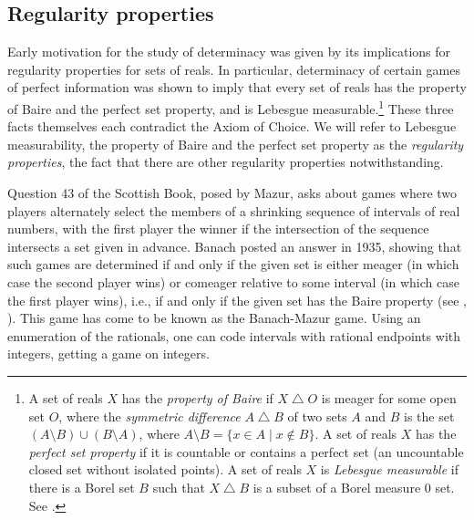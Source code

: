 \documentclass{book}%
\begin{document}



\subsection{Regularity properties}\label{regularitysection}

Early motivation for the study of determinacy was given by its
implications for regularity properties for sets of reals. In
particular, determinacy of certain games of perfect information was
shown to imply that every set of reals has the property of Baire and
the perfect set property, and is Lebesgue measurable.\footnote{A set
of reals $X$ has the \emph{property of Baire}
if $X \bigtriangleup O$ is meager for some open set $O$,
where the \emph{symmetric difference} $A
\bigtriangleup B$ of two sets $A$ and $B$ is the set $(A \setminus
B) \cup (B \setminus A)$, where $A \setminus B = \{ x \in A \mid x
\not\in B\}$. A set of reals $X$ has the
\emph{perfect set property} if it is
countable or contains a perfect set (an uncountable closed set
without isolated points). A set of reals $X$ is \emph{Lebesgue
measurable} if there is a Borel set
$B$ such that $X \bigtriangleup B$ is a subset of a Borel measure $0$ set. See
\cite{Oxtoby}.} These three facts themselves each contradict the Axiom
of Choice. We will refer to Lebesgue measurability, the property of
Baire and the perfect set property as the \emph{regularity
properties}, the fact that there are
other regularity properties notwithstanding.

Question 43 of the Scottish Book, posed by Mazur, asks about games
where two players alternately select the members of a shrinking
sequence of intervals of real numbers, with the first player the
winner if the intersection of the sequence intersects a set given in
advance. Banach posted an answer in 1935, showing that such games
are determined if and only if the given set is either meager (in which case the
second player wins) or comeager relative to some interval (in which
case the first player wins), i.e., if and only if the given set has the Baire property (see \cite[pp.~27-30]{Oxtoby}, \cite[pp.~373-374]{Kanamori}).
This game has come to be known as the
Banach-Mazur game. Using an enumeration of the rationals,
one can code intervals with rational
endpoints with integers, getting a game on integers.
\end{document}

